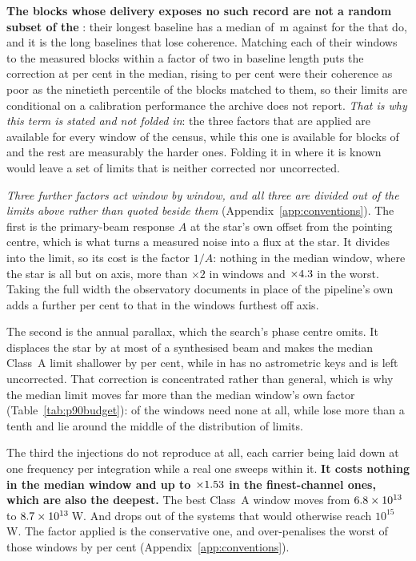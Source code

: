 \textbf{The \RpDecNUn{} blocks whose delivery exposes no such record are not
a random subset of the \SensDecorNBlkTot}: their longest baseline has a median
of \RpDecBlUn\,m against \RpDecBlMeas{} for the \SensDecorNBlk{} that do, and
it is the long baselines that lose coherence. Matching each of their windows
to the measured blocks within a factor of two in baseline length puts the
correction at \RpDecMatchMed{} per cent in the median, rising to
\RpDecMatchHi{} per cent were their coherence as poor as the ninetieth
percentile of the blocks matched to them, so their limits are conditional on
a calibration performance the archive does not report. \emph{That is why this
term is stated and not folded in}: the three factors that are applied are
available for every window of the census, while this one is available for
\SensDecorNBlk{} blocks of \SensDecorNBlkTot{} and the rest are measurably
the harder ones. Folding it in where it is known would leave a set of limits
that is neither corrected nor uncorrected.

\emph{Three further factors act window by window, and all three are divided
out of the limits above rather than quoted beside them}
(Appendix~\ref{app:conventions}). The first is the primary-beam response
$A$ at the star's own offset from the pointing centre, which is what turns a
measured noise into a flux at the star. It divides into the limit, so its
cost is the factor $1/A$: nothing in the median window, where the star is all
but on axis, more than $\times2$ in \NmBeamNFacTwo{} windows and
$\times4.3$ in the worst. Taking the full width the observatory
documents in place of the pipeline's own adds a further \BmShiftMaxPct{} per
cent to that in the \BmNAboveTenPct{} windows furthest off axis.

The second is the annual parallax, which the search's phase centre omits. It
displaces the star by at most \SensBeamsMax{} of a synthesised beam and makes
the median Class~A limit shallower by \PxaShiftWinPct{} per cent, while
\PxaMissingStar{} in \PxaMissingEb{} has no astrometric keys and is left
uncorrected. That correction is concentrated rather than general, which is
why the median limit moves far more than the median window's own factor
(Table~\ref{tab:p90budget}): \RpPxNNone{} of the \NWinA{} windows need none
at all, while \RpPxNBig{} lose more than a tenth and lie around the middle of
the distribution of limits.

The third the injections do not reproduce at all, each carrier being laid
down at one frequency per integration while a real one sweeps within it.
\textbf{It costs nothing in the median window and up to
$\times1.53$ in the \SmcNAbove{} finest-channel ones, which are also
the deepest.} The best Class~A window moves from $6.8\times10^{13}$ to
$8.7\times10^{13}$\,W. And \SmcLostStars{} drops out of the
\SmcSysEfifteenWas{} systems that would otherwise reach $10^{15}$\,W. The factor applied is the conservative one, and
over-penalises the worst of those windows by \NmRespOverPct{} per cent
(Appendix~\ref{app:conventions}).

